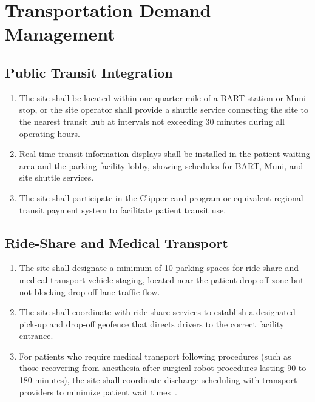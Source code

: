 \documentclass[11pt,letterpaper]{article}
\begin{document}
\section{Transportation Demand Management}

\subsection{Public Transit Integration}

\begin{enumerate}[label=(\alph*)]
\item The site shall be located within one-quarter mile of a BART station or
  Muni stop, or the site operator shall provide a shuttle service connecting
  the site to the nearest transit hub at intervals not exceeding 30 minutes
  during all operating hours.

\item Real-time transit information displays shall be installed in the patient
  waiting area and the parking facility lobby, showing schedules for BART,
  Muni, and site shuttle services.

\item The site shall participate in the Clipper card program or equivalent
  regional transit payment system to facilitate patient transit use.
\end{enumerate}

\subsection{Ride-Share and Medical Transport}

\begin{enumerate}[label=(\alph*)]
\item The site shall designate a minimum of 10 parking spaces for ride-share
  and medical transport vehicle staging, located near the patient drop-off
  zone but not blocking drop-off lane traffic flow.

\item The site shall coordinate with ride-share services to establish a
  designated pick-up and drop-off geofence that directs drivers to the
  correct facility entrance.

\item For patients who require medical transport following procedures (such as
  those recovering from anesthesia after surgical robot procedures lasting
  90 to 180 minutes), the site shall coordinate discharge scheduling with
  transport providers to minimize patient wait
  times~\cite{patientinstructions2026}.
\end{enumerate}
\end{document}
